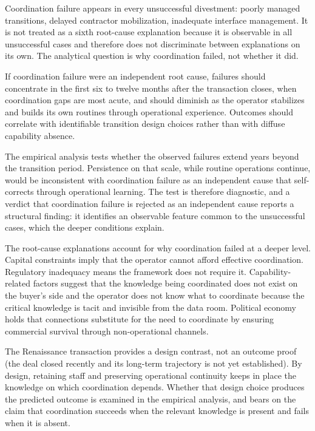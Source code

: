 \documentclass[twoside,fontset=lmodern]{mitthesis}
\begin{document}
Coordination failure appears in every unsuccessful divestment: poorly
managed transitions, delayed contractor mobilization, inadequate
interface management. It is not treated as a sixth root-cause
explanation because it is observable in all unsuccessful cases and
therefore does not discriminate between explanations on its own. The
analytical question is why coordination failed, not whether it did.

If coordination failure were an independent root cause, failures should
concentrate in the first six to twelve months after the transaction
closes, when coordination gaps are most acute, and should diminish as
the operator stabilizes and builds its own routines through operational
experience. Outcomes should correlate with identifiable transition
design choices rather than with diffuse capability absence.

The empirical analysis tests whether the observed failures extend years
beyond the transition period. Persistence on that scale, while routine
operations continue, would be inconsistent with coordination failure as
an independent cause that self-corrects through operational learning.
The test is therefore diagnostic, and a verdict that coordination
failure is rejected as an independent cause reports a structural
finding: it identifies an observable feature common to the unsuccessful
cases, which the deeper conditions explain.

The root-cause explanations account for why coordination failed at a
deeper level. Capital constraints imply that the operator cannot afford
effective coordination. Regulatory inadequacy means the framework does
not require it. Capability-related factors suggest that the knowledge
being coordinated does not exist on the buyer's side and the operator
does not know what to coordinate because the critical knowledge is tacit
and invisible from the data room. Political economy holds that
connections substitute for the need to coordinate by ensuring commercial
survival through non-operational channels.

The Renaissance transaction provides a design contrast, not an outcome
proof (the deal closed recently and its long-term trajectory is not yet
established). By design, retaining staff and preserving operational
continuity keeps in place the knowledge on which coordination depends.
Whether that design choice produces the predicted outcome is examined in
the empirical analysis, and bears on the claim that coordination
succeeds when the relevant knowledge is present and fails when it is
absent.
\end{document}
